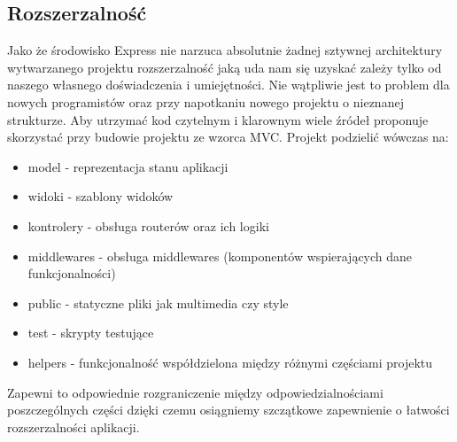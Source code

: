 \documentclass[12pt]{report}
\begin{document}
    \subsection{Rozszerzalność}
      Jako że środowisko Express nie narzuca absolutnie żadnej sztywnej architektury wytwarzanego projektu rozszerzalność jaką uda nam się uzyskać zależy tylko od naszego własnego doświadczenia i umiejętności.
      Nie wątpliwie jest to problem dla nowych programistów oraz przy napotkaniu nowego projektu o nieznanej strukturze.
      Aby utrzymać kod czytelnym i klarownym wiele źródeł proponuje skorzystać przy budowie projektu ze wzorca MVC.
      Projekt podzielić wówczas na:
      \begin{itemize}
        \item model - reprezentacja stanu aplikacji
        \item widoki - szablony widoków
        \item kontrolery - obsługa routerów oraz ich logiki
        \item middlewares - obsługa middlewares (komponentów wspierających dane funkcjonalności)
        \item public - statyczne pliki jak multimedia czy style
        \item test - skrypty testujące
        \item helpers - funkcjonalność współdzielona między różnymi częściami projektu
      \end{itemize}
      Zapewni to odpowiednie rozgraniczenie między odpowiedzialnościami poszczególnych części dzięki czemu osiągniemy szczątkowe zapewnienie o łatwości rozszerzalności aplikacji. 
      
\end{document}
